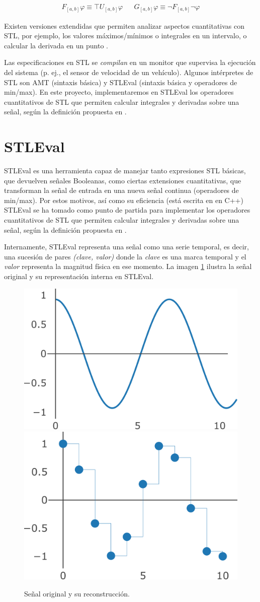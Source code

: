 \begin{align*}
F_{[a,b]} \varphi \equiv \top U_{[a,b]} \varphi & &
G_{[a,b]} \varphi \equiv \neg F_{[a,b]} \neg \varphi
\end{align*}

Existen versiones extendidas que permiten analizar aspectos cuantitativas con STL, por ejemplo, los valores máximos/mínimos \cite{TACAS_19} o integrales en un intervalo, o calcular la derivada en un punto \cite{Stl_Der_Int}.


Las especificaciones en STL se \textit{compilan} en un monitor que supervisa la ejecución del sistema (p. ej., el sensor de velocidad de un vehículo). Algunos intérpretes de STL son AMT \cite{AMT2} (sintaxis básica) y STLEval \cite{StlEval} (sintaxis básica y operadores de min/max). En este proyecto, implementaremos en STLEval los operadores cuantitativos de STL que permiten calcular integrales y derivadas sobre una señal, según la definición propuesta en \cite{Stl_Der_Int}.

\section{STLEval}
STLEval es una herramienta capaz de manejar tanto expresiones STL básicas, que devuelven señales Booleanas, como ciertas extensiones cuantitativas, que transforman la señal de entrada en una nueva señal continua (operadores de min/max). Por estos motivos, así como su eficiencia (está escrita en en C++) STLEval se ha tomado como punto de partida para implementar los operadores cuantitativos de STL que permiten calcular integrales y derivadas sobre una señal, según la definición propuesta en \cite{Stl_Der_Int}.

Internamente, STLEval representa una señal como una serie temporal, es decir, una sucesión de pares \textit{(clave, valor)} donde la \textit{clave} es una marca temporal y el \textit{valor} representa la magnitud física en ese momento. La imagen \ref{fig:senal} ilustra la señal original y su representación interna en STLEval. 

\begin{figure}
\centering
  \includegraphics[width=.4\linewidth]{images/senal_original} \hfill
  \includegraphics[width=.4\linewidth]{images/senal_muestreada}
\caption{Señal original y su reconstrucción.}
\label{fig:senal}
\end{figure}

